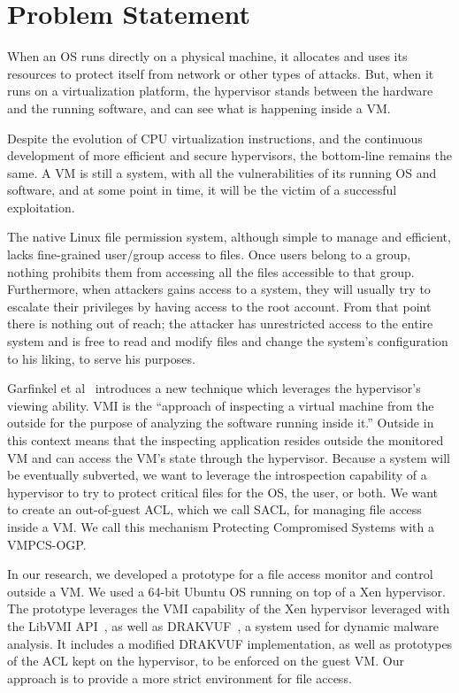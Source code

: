 \section{Problem Statement}\label{sec:problem} 
When an \ac{OS} runs directly on a physical machine, it allocates and uses its resources to protect itself from network or other types of attacks. But, when it runs on a virtualization platform, the hypervisor stands between the hardware and the running software, and can see what is happening inside a \ac{VM}. 

\par Despite the evolution of \ac{CPU} virtualization instructions, and the continuous development of more efficient and secure hypervisors, the bottom-line remains the same. A \ac{VM} is still a system, with all the vulnerabilities of its running \ac{OS} and software, and at some point in time, it will be the victim of a successful exploitation. 

\par The native Linux file permission system, although simple to manage and efficient, lacks fine-grained user/group access to files. Once users belong to a group, nothing prohibits them from accessing all the files accessible to that group. Furthermore, when attackers gains access to a system, they will usually try to escalate their privileges by having access to the root account. From that point there is nothing out of reach; the attacker has unrestricted access to the entire system and is free to read and modify files and change the system's configuration to his liking, to serve his purposes.

\par Garfinkel et al~\cite{garfinkel2003virtual} introduces a new technique which leverages the hypervisor's viewing ability. \ac{VMI} is the “approach of inspecting a virtual machine from the outside for the purpose of analyzing the software running inside it.” Outside in this context means that the inspecting application resides outside the monitored \ac{VM} and can access the \ac{VM}'s state through the hypervisor. Because a system will be eventually subverted, we want to leverage the introspection capability of a hypervisor to try to protect critical files for the OS, the user, or both. We want to create an out-of-guest \ac{ACL}, which we call \ac{SACL}, for managing file access inside a VM. We call this mechanism Protecting Compromised Systems with a \ac{VMPCS-OGP}.

\par In our research, we developed a prototype for a file access monitor and control outside a \ac{VM}. We used a 64-bit Ubuntu OS running on top of a Xen hypervisor. The prototype leverages the \ac{VMI} capability of the Xen hypervisor leveraged with the LibVMI \ac{API}~\cite{payne2011libvmi}, as well as DRAKVUF~\cite{lengyel2014drakvuf}, a system used for dynamic malware analysis. It includes a modified DRAKVUF implementation, as well as prototypes of the \ac{ACL} kept on the hypervisor, to be enforced on the guest \ac{VM}. Our approach is to provide a more strict environment for file access.

